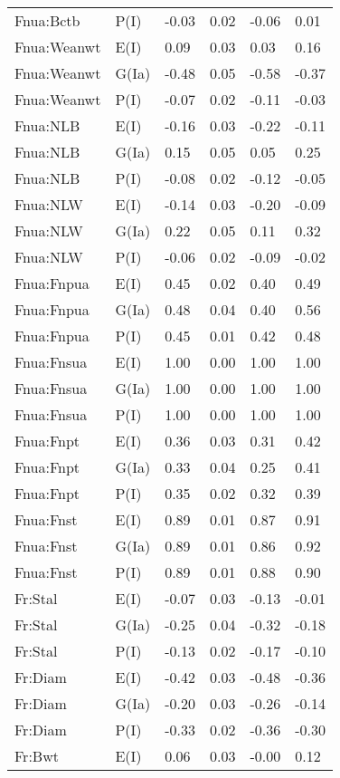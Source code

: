 \begin{center}
\begin{longtable}{|p{1.1in}|p{0.7in}|p{0.7in}|p{0.6in}|p{0.6in}|p{0.6in}|}
  Fnua:Bctb & P(I) & -0.03 & 0.02 & -0.06 & 0.01 \\ 
  Fnua:Weanwt & E(I) & 0.09 & 0.03 & 0.03 & 0.16 \\ 
  Fnua:Weanwt & G(Ia) & -0.48 & 0.05 & -0.58 & -0.37 \\ 
  Fnua:Weanwt & P(I) & -0.07 & 0.02 & -0.11 & -0.03 \\ 
  Fnua:NLB & E(I) & -0.16 & 0.03 & -0.22 & -0.11 \\ 
  Fnua:NLB & G(Ia) & 0.15 & 0.05 & 0.05 & 0.25 \\ 
  Fnua:NLB & P(I) & -0.08 & 0.02 & -0.12 & -0.05 \\ 
  Fnua:NLW & E(I) & -0.14 & 0.03 & -0.20 & -0.09 \\ 
  Fnua:NLW & G(Ia) & 0.22 & 0.05 & 0.11 & 0.32 \\ 
  Fnua:NLW & P(I) & -0.06 & 0.02 & -0.09 & -0.02 \\ 
  Fnua:Fnpua & E(I) & 0.45 & 0.02 & 0.40 & 0.49 \\ 
  Fnua:Fnpua & G(Ia) & 0.48 & 0.04 & 0.40 & 0.56 \\ 
  Fnua:Fnpua & P(I) & 0.45 & 0.01 & 0.42 & 0.48 \\ 
  Fnua:Fnsua & E(I) & 1.00 & 0.00 & 1.00 & 1.00 \\ 
  Fnua:Fnsua & G(Ia) & 1.00 & 0.00 & 1.00 & 1.00 \\ 
  Fnua:Fnsua & P(I) & 1.00 & 0.00 & 1.00 & 1.00 \\ 
  Fnua:Fnpt & E(I) & 0.36 & 0.03 & 0.31 & 0.42 \\ 
  Fnua:Fnpt & G(Ia) & 0.33 & 0.04 & 0.25 & 0.41 \\ 
  Fnua:Fnpt & P(I) & 0.35 & 0.02 & 0.32 & 0.39 \\ 
  Fnua:Fnst & E(I) & 0.89 & 0.01 & 0.87 & 0.91 \\ 
  Fnua:Fnst & G(Ia) & 0.89 & 0.01 & 0.86 & 0.92 \\ 
  Fnua:Fnst & P(I) & 0.89 & 0.01 & 0.88 & 0.90 \\ 
  Fr:Stal & E(I) & -0.07 & 0.03 & -0.13 & -0.01 \\ 
  Fr:Stal & G(Ia) & -0.25 & 0.04 & -0.32 & -0.18 \\ 
  Fr:Stal & P(I) & -0.13 & 0.02 & -0.17 & -0.10 \\ 
  Fr:Diam & E(I) & -0.42 & 0.03 & -0.48 & -0.36 \\ 
  Fr:Diam & G(Ia) & -0.20 & 0.03 & -0.26 & -0.14 \\ 
  Fr:Diam & P(I) & -0.33 & 0.02 & -0.36 & -0.30 \\ 
  Fr:Bwt & E(I) & 0.06 & 0.03 & -0.00 & 0.12 \\ 

\end{longtable}
\end{center}
